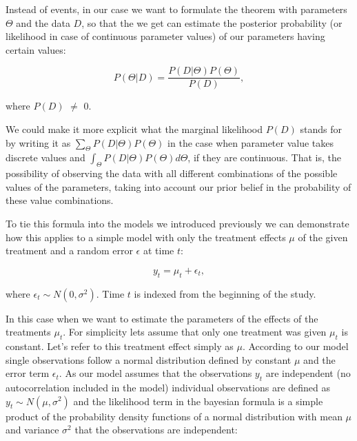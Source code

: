 \documentclass[12pt,a4paper,leqno]{report}
\theoremstyle{plain}
\theoremstyle{definition}
\theoremstyle{remark}
\begin{document}
Instead of events, in our case we want to formulate the theorem with parameters \(\Theta \)
and the data \(D\), so that the we get can estimate the posterior
probability (or likelihood in case of continuous parameter values) of our parameters having certain values:

\begin{def}\label{}
    \begin{equation}
        P(\Theta|D) = \frac{P(D|\Theta)P(\Theta)}{P(D)},
    \end{equation}
\end{def}where \(P(D)\) \(\neq \) 0.

We could make it more explicit what the marginal likelihood \(P(D)\) stands for by
writing it as \(\sum_\Theta P(D|\Theta)P(\Theta)\) in the case when parameter value takes discrete values
and \(\int_\Theta P(D|\Theta)P(\Theta) d\Theta \), if they are continuous. That is, the possibility of
observing the data with all different combinations of the possible values of the parameters,
taking into account our prior belief in the probability of these value combinations.

To tie this formula into the models we introduced previously we can demonstrate how this
applies to a simple model with only the treatment effects \(\mu \) of the given treatment
and a random error \(\epsilon \) at time \(t\):

\begin{def}\label{}
    \begin{equation}\label{}
        y_t = \mu_t + \epsilon_t,
    \end{equation}
\end{def}where \(\epsilon_{t} \sim N(0,\sigma^2)\). Time \(t\) is indexed from the
beginning of the study.

In this case when we want to estimate the parameters of the effects of the treatments \(\mu_t\).
For simplicity lets assume that only one treatment was given \(\mu_t\) is constant. Let's refer to this treatment
effect simply as \(\mu \).
According to our model single observations follow a normal distribution defined by constant \(\mu \)
and the error term \(\epsilon_t \). As our model assumes that the
observations \(y_t\) are independent
(no autocorrelation included in the model) individual observations are defined as \(y_t \sim N(\mu,\sigma^2) \)
and the likelihood term in the bayesian
formula is a simple product of the probability density functions of
a normal distribution with mean \(\mu \) and variance \(\sigma^2 \)
that the observations are independent:
\end{document}
